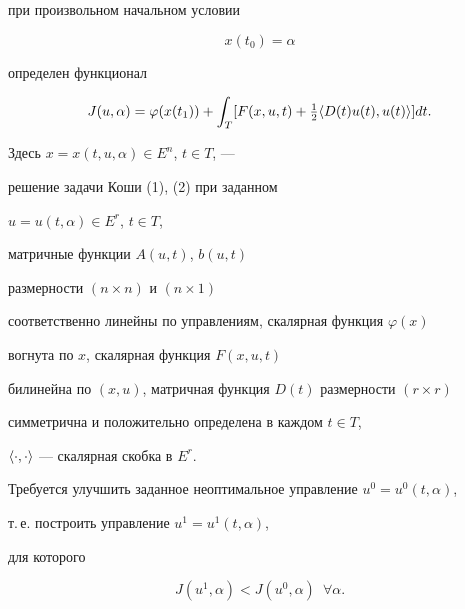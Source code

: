при произвольном начальном условии


\begin{equation}


x(t_0)=\alpha


\end{equation}


определен функционал


\begin{equation}


J(u,\alpha)=\varphi(x(t_1))+\int_T [F(x,u,t)+


\tfrac{1}{2}\la D(t)u(t),u(t)\ra]dt. 


\end{equation}


Здесь $x=x(t,u,\alpha)\in E^n$, $t\in T$, --- 


решение задачи Коши (1), (2) при заданном


$u=u(t,\alpha)\in E^r$, $t\in T$,


матричные функции $A(u,t)$, $b(u,t)$


размерности $(n\times n)$ и $(n\times 1)$ 


соответственно линейны по управлениям, скалярная функция $\varphi(x)$


вогнута по $x$, скалярная функция $F(x,u,t)$ 


билинейна по $(x,u)$, матричная функция $D(t)$ размерности $(r\times r)$


симметрична и положительно определена в каждом $t\in T$,


$\langle\cdot,\cdot\rangle$ --- скалярная скобка в $E^r$.





Требуется улучшить заданное неоптимальное управление $u^0=u^0(t,\alpha)$,


т.\,е. построить управление $u^1=u^1(t,\alpha)$,


для которого 


$$


J(u^1,\alpha)<J(u^0,\alpha) \ \; \forall \alpha.


$$





